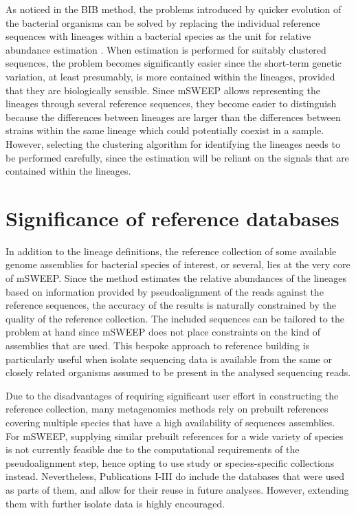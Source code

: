 \documentclass[officiallayout]{tktla}
\begin{document}
As noticed in the BIB method, the problems introduced by quicker
evolution of the bacterial organisms can be solved by replacing the
individual reference sequences with lineages within a bacterial
species as the unit for relative abundance estimation
\citep{sankar2016bayesian}. When estimation is performed for suitably
clustered sequences, the problem becomes significantly easier since
the short-term genetic variation, at least presumably, is more
contained within the lineages, provided that they are biologically
sensible. Since mSWEEP allows representing the lineages through
several reference sequences, they become easier to distinguish because
the differences between lineages are larger than the differences
between strains within the same lineage which could potentially
coexist in a sample. However, selecting the clustering algorithm for
identifying the lineages needs to be performed carefully, since the
estimation will be reliant on the signals that are contained within
the lineages.

\section{Significance of reference databases}

In addition to the lineage definitions, the reference collection of
some available genome assemblies for  bacterial species of interest,
or several, lies at the very core of mSWEEP. Since the method
estimates the relative abundances of the lineages based on information
provided by pseudoalignment of the reads against the reference
sequences, the accuracy of the results is naturally constrained by the
quality of the reference collection. The included sequences can be
tailored to the problem at hand since mSWEEP does not place
constraints on the kind of assemblies that are used. This bespoke
approach to reference building is particularly useful when isolate
sequencing data is available from the same or closely related
organisms assumed to be present in the analysed sequencing reads.

Due to the disadvantages of requiring significant user effort in
constructing the reference collection, many metagenomics methods rely
on prebuilt references covering multiple species that have a high
availability of sequences assemblies. For mSWEEP, supplying similar
prebuilt references for a wide variety of species is not currently
feasible due to the computational requirements of the pseudoalignment
step, hence opting to use study or species-specific collections
instead. Nevertheless, Publications I-III do include the databases
that were used as parts of them, and allow for their reuse in future
analyses. However, extending them with further isolate data is highly
encouraged.
\end{document}
